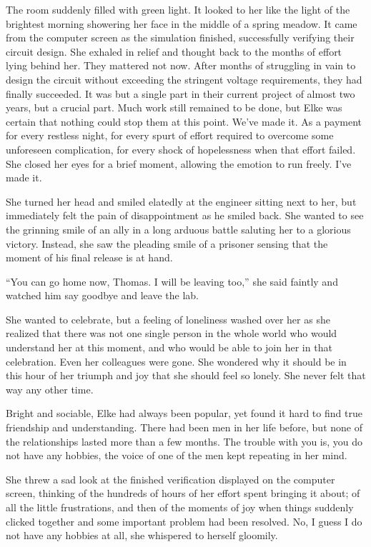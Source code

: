 The room suddenly filled with green light. It looked to her like the light of the brightest morning showering her face in the middle of a spring meadow. It came from the computer screen as the simulation finished, successfully verifying their circuit design. She exhaled in relief and thought back to the months of effort lying behind her. They mattered not now. After months of struggling in vain to design the circuit without exceeding the stringent voltage requirements, they had finally succeeded. It was but a single part in their current project of almost two years, but a crucial part. Much work still remained to be done, but Elke was certain that nothing could stop them at this point. We've made it. As a payment for every restless night, for every spurt of effort required to overcome some unforeseen complication, for every shock of hopelessness when that effort failed. She closed her eyes for a brief moment, allowing the emotion to run freely. I've made it.

She turned her head and smiled elatedly at the engineer sitting next to her, but immediately felt the pain of disappointment as he smiled back. She wanted to see the grinning smile of an ally in a long arduous battle saluting her to a glorious victory. Instead, she saw the pleading smile of a prisoner sensing that the moment of his final release is at hand.

``You can go home now, Thomas. I will be leaving too,'' she said faintly and watched him say goodbye and leave the lab.

She wanted to celebrate, but a feeling of loneliness washed over her as she realized that there was not one single person in the whole world who would understand her at this moment, and who would be able to join her in that celebration. Even her colleagues were gone. She wondered why it should be in this hour of her triumph and joy that she should feel so lonely. She never felt that way any other time.

Bright and sociable, Elke had always been popular, yet found it hard to find true friendship and understanding. There had been men in her life before, but none of the relationships lasted more than a few months. The trouble with you is, you do not have any hobbies, the voice of one of the men kept repeating in her mind.

She threw a sad look at the finished verification displayed on the computer screen, thinking of the hundreds of hours of her effort spent bringing it about; of all the little frustrations, and then of the moments of joy when things suddenly clicked together and some important problem had been resolved. No, I guess I do not have any hobbies at all, she whispered to herself gloomily.


